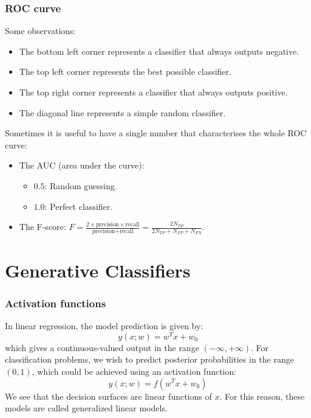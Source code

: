\documentclass{beamer}
\begin{document}
\begin{frame}
    \frametitle{ROC curve}
    Some observations:
    \begin{itemize}
        \item The bottom left corner represents a classifier that always outputs negative.
        \item The top left corner represents the best possible classifier.
        \item The top right corner represents a classifier that always outputs positive.
        \item The diagonal line represents a simple random classifier.
    \end{itemize}
    Sometimes it is useful to have a single number that characterises the whole ROC curve:
    \begin{itemize}
        \item The AUC (area under the curve):
        \begin{itemize}
            \item $0.5$: Random guessing.
            \item $1.0$: Perfect classifier.
        \end{itemize}
        \item The F-score: $F=\frac{2\times\textrm{precision}\times\textrm{recall}}{\textrm{precision}+\textrm{recall}}=\frac{2N_{TP}}{2N_{TP}+N_{FP}+N_{FN}}$.
    \end{itemize}
\end{frame}

\section{Generative Classifiers}

\begin{frame}
    \frametitle{Activation functions}
    In linear regression, the model prediction is given by:
    \begin{equation*}
        y(x;w)=w^{T}x+w_{0}
    \end{equation*}
    which gives a continuous-valued output in the range $(-\infty,+\infty)$. For classification problems, we wish to predict posterior probabilities in the range $(0,1)$, which could be achieved using an activation function:
    \begin{equation*}
        y(x;w)=f(w^{T}x+w_{0})
    \end{equation*}
    We see that the decision surfaces are linear functions of $x$. For this reason, these models are called generalized linear models.
\end{frame}
\end{document}
